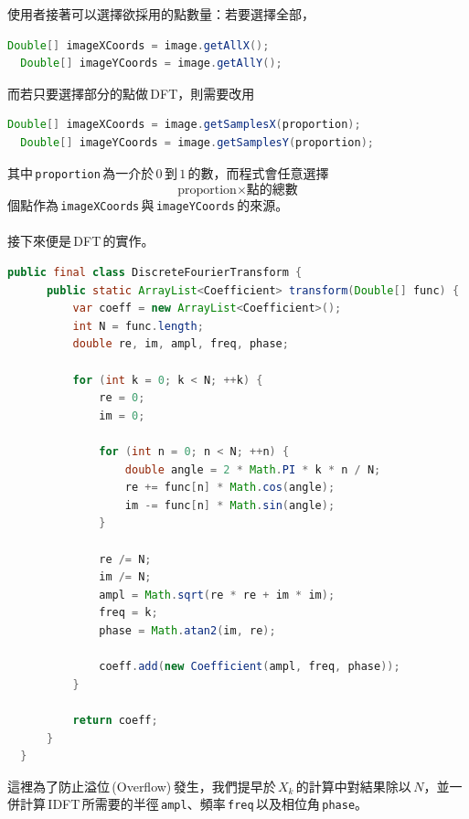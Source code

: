   \noindent 使用者接著可以選擇欲採用的點數量：若要選擇全部，
  \begin{lstlisting}[language=Java]
  Double[] imageXCoords = image.getAllX();
  Double[] imageYCoords = image.getAllY();
  \end{lstlisting}
  \noindent 而若只要選擇部分的點做\,DFT，則需要改用
  \begin{lstlisting}[language=Java]
  Double[] imageXCoords = image.getSamplesX(proportion);
  Double[] imageYCoords = image.getSamplesY(proportion);
  \end{lstlisting}
  \noindent 其中\,\texttt{proportion}\,為一介於\,\(0\)\,到\,\(1\)\,的數，而程式會任意選擇
  \[\text{proportion}\times\text{點的總數}\]
  個點作為\,\texttt{imageXCoords}\,與\,\texttt{imageYCoords}\,的來源。
  \\\\
  接下來便是\,DFT\,的實作。
  \begin{lstlisting}[language=Java]
  public final class DiscreteFourierTransform {
      public static ArrayList<Coefficient> transform(Double[] func) {
          var coeff = new ArrayList<Coefficient>();
          int N = func.length;
          double re, im, ampl, freq, phase;

          for (int k = 0; k < N; ++k) {
              re = 0;
              im = 0;

              for (int n = 0; n < N; ++n) {
                  double angle = 2 * Math.PI * k * n / N;
                  re += func[n] * Math.cos(angle);
                  im -= func[n] * Math.sin(angle);
              }

              re /= N;
              im /= N;
              ampl = Math.sqrt(re * re + im * im);
              freq = k;
              phase = Math.atan2(im, re);

              coeff.add(new Coefficient(ampl, freq, phase));
          }

          return coeff;
      }
  }
  \end{lstlisting}
  \noindent 這裡為了防止溢位\,(Overflow)\,發生，我們提早於\,\(X_k\)\,的計算中對結果除以\,\(N\)，並一併計算\,IDFT\,所需要的半徑\,\texttt{ampl}、頻率\,\texttt{freq}\,以及相位角\,\texttt{phase}。
  
